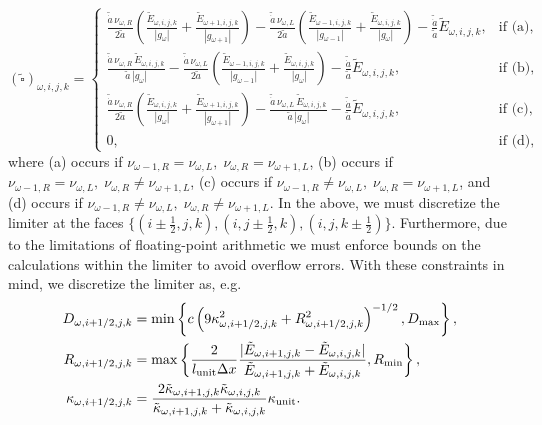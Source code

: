 \documentclass[10pt]{article}
\renewcommand{\(}{\left(}
\renewcommand{\)}{\right)}
\newcommand{\adot}{\dot{a}}
\newcommand{\Lunit}{l_{\text{unit}}}
\newcommand{\Kunit}{\kappa_{\text{unit}}}
\newcommand{\tK}{\tilde{\kappa}}
\newcommand{\tE}{\tilde{E}}
\newcommand{\tA}{\tilde{a}}
\newcommand{\tAdot}{\tilde{\adot}}
\begin{document}
\begin{equation}
\label{eq:square_omega_normalized_discretized}
  (\tilde{\square})_{\omega,i,j,k} = \begin{cases}
     \frac{\tAdot\, \nu_{\omega,R}}{2\tA}\left(\frac{\tE_{\omega,i,j,k}}{|g_{\omega}|} + \frac{\tE_{\omega+1,i,j,k}}{|g_{\omega+1}|}\right) -
      \frac{\tAdot\, \nu_{\omega,L}}{2\tA}\left(\frac{\tE_{\omega-1,i,j,k}}{|g_{\omega-1}|}+\frac{\tE_{\omega,i,j,k}}{|g_{\omega}|}\right) -
      \frac{\tAdot}{\tA}\tE_{\omega,i,j,k},&
      \text{if (a)},\\
     \frac{\tAdot\, \nu_{\omega,R}\, \tE_{\omega,i,j,k}}{\tA\, |g_{\omega}|} -
      \frac{\tAdot\, \nu_{\omega,L}}{2\tA}\left(\frac{\tE_{\omega-1,i,j,k}}{|g_{\omega-1}|}+\frac{\tE_{\omega,i,j,k}}{|g_{\omega}|}\right) -
      \frac{\tAdot}{\tA}\tE_{\omega,i,j,k},&
      \text{if (b)},\\
     \frac{\tAdot\, \nu_{\omega,R}}{2\tA}\left(\frac{\tE_{\omega,i,j,k}}{|g_{\omega}|} + \frac{\tE_{\omega+1,i,j,k}}{|g_{\omega+1}|}\right) -
      \frac{\tAdot\, \nu_{\omega,L}\, \tE_{\omega,i,j,k}}{\tA\, |g_{\omega}|} -
      \frac{\tAdot}{\tA}\tE_{\omega,i,j,k},&
      \text{if (c)},\\
     0,& \text{if (d)},
  \end{cases}
\end{equation}
where (a) occurs if $\nu_{\omega-1,R}=\nu_{\omega,L},\;\nu_{\omega,R}=\nu_{\omega+1,L}$, 
(b) occurs if $\nu_{\omega-1,R}=\nu_{\omega,L},\; \nu_{\omega,R}\ne\nu_{\omega+1,L}$, 
(c) occurs if $\nu_{\omega-1,R}\ne\nu_{\omega,L},\; \nu_{\omega,R}=\nu_{\omega+1,L}$, 
and (d) occurs if $\nu_{\omega-1,R}\ne\nu_{\omega,L},\; \nu_{\omega,R}\ne\nu_{\omega+1,L}$.
In the above, we must discretize the limiter at the faces
$\{(i\pm\frac12,j,k),(i,j\pm\frac12,k),(i,j,k\pm\frac12)\}$.
Furthermore, due to the limitations of floating-point arithmetic we
must enforce bounds on the calculations within the limiter to avoid
overflow errors.  With these constraints in mind, we discretize the
limiter as, e.g.
\begin{align}
  \label{eq:discrete_limiter}
  D_{\omega,i+1/2,j,k} &= \min\left\{ c \left(9\kappa_{\omega,i+1/2,j,k}^2 + R_{\omega,i+1/2,j,k}^2\right)^{-1/2},
    D_\text{max} \right\},\\
  \notag
  R_{\omega,i+1/2,j,k} &= \max\left\{\frac{2}{\Lunit \Delta x} \frac{|\tE_{\omega,i+1,j,k}-\tE_{\omega,i,j,k}|}{\tE_{\omega,i+1,j,k}+\tE_{\omega,i,j,k}}, R_\text{min} \right\}, \\
  \notag
  \kappa_{\omega,i+1/2,j,k} &= \frac{2 \tK_{\omega,i+1,j,k} \tK_{\omega,i,j,k}}{\tK_{\omega,i+1,j,k} + \tK_{\omega,i,j,k}}\Kunit.
\end{align}
\end{document}
